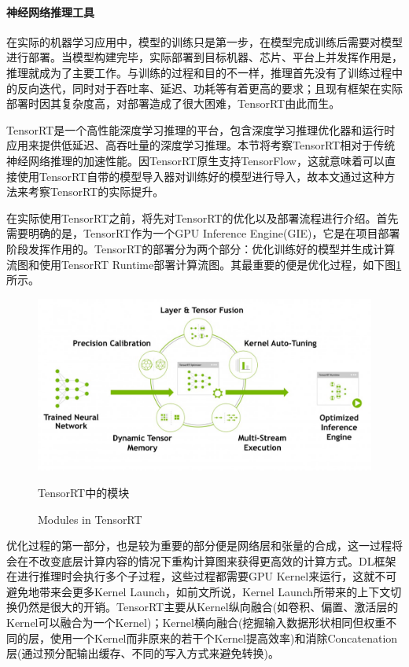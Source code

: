 \paragraph{神经网络推理工具}
\par 在实际的机器学习应用中，模型的训练只是第一步，在模型完成训练后需要对模型进行部署。当模型构建完毕，实际部署到目标机器、芯片、平台上并发挥作用是，推理就成为了主要工作。与训练的过程和目的不一样，推理首先没有了训练过程中的反向迭代，同时对于吞吐率、延迟、功耗等有着更高的要求；且现有框架在实际部署时因其复杂度高，对部署造成了很大困难，TensorRT由此而生。
\par TensorRT是一个高性能深度学习推理的平台，包含深度学习推理优化器和运行时应用来提供低延迟、高吞吐量的深度学习推理。本节将考察TensorRT相对于传统神经网络推理的加速性能\parencite{TENSORRT}。因TensorRT原生支持TensorFlow，这就意味着可以直接使用TensorRT自带的模型导入器对训练好的模型进行导入，故本文通过这种方法来考察TensorRT的实际提升。
\par 在实际使用TensorRT之前，将先对TensorRT的优化以及部署流程进行介绍。首先需要明确的是，TensorRT作为一个GPU Inference Engine(GIE)，它是在项目部署阶段发挥作用的。TensorRT的部署分为两个部分：优化训练好的模型并生成计算流图和使用TensorRT Runtime部署计算流图。其最重要的便是优化过程，如下图\ref{Fig.TensorRT}所示\parencite{TENSORRTDOC}。
\begin{figure}
	\centering
	\includegraphics[width=15cm]{figures/TensorRT.jpg}
	\renewcommand{\thefigure}{\arabic{section}-\arabic{figure} }
	\renewcommand{\figurename}{图}
	\caption{TensorRT中的模块}
	\addtocounter{figure}{-1}
	\renewcommand{\thefigure}{\arabic{section}-\arabic{figure} }
	\renewcommand{\figurename}{Figure}
	\caption{Modules in TensorRT}
	\label{Fig.TensorRT}
\end{figure}
\par 优化过程的第一部分，也是较为重要的部分便是网络层和张量的合成，这一过程将会在不改变底层计算内容的情况下重构计算图来获得更高效的计算方式。DL框架在进行推理时会执行多个子过程，这些过程都需要GPU Kernel来运行，这就不可避免地带来会更多Kernel Launch，如前文所说，Kernel Launch所带来的上下文切换仍然是很大的开销。TensorRT主要从Kernel纵向融合(如卷积、偏置、激活层的Kernel可以融合为一个Kernel)；Kernel横向融合(挖掘输入数据形状相同但权重不同的层，使用一个Kernel而非原来的若干个Kernel提高效率)和消除Concatenation层(通过预分配输出缓存、不同的写入方式来避免转换)。
